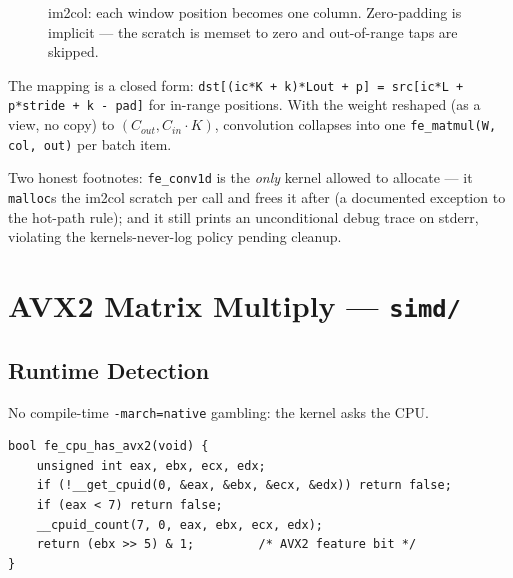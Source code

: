 \documentclass[11pt,a4paper]{article}
\begin{document}
\begin{figure}[h]
\centering
{}
\caption{im2col: each window position becomes one column. Zero-padding is
implicit --- the scratch is memset to zero and out-of-range taps are skipped.}
\label{fig:im2col}
\end{figure}

The mapping is a closed form: \texttt{dst[(ic*K + k)*Lout + p] = src[ic*L +
p*stride + k - pad]} for in-range positions. With the weight reshaped (as a
view, no copy) to $(C_{out}, C_{in}{\cdot}K)$, convolution collapses into one
\texttt{fe\_matmul(W, col, out)} per batch item.

Two honest footnotes: \texttt{fe\_conv1d} is the \emph{only} kernel allowed to
allocate --- it \texttt{malloc}s the im2col scratch per call and frees it after
(a documented exception to the hot-path rule); and it still prints an
unconditional debug trace on stderr, violating the kernels-never-log policy
pending cleanup.

\section{AVX2 Matrix Multiply --- \texttt{simd/}}

\subsection{Runtime Detection}

No compile-time \texttt{-march=native} gambling: the kernel asks the CPU.

\begin{lstlisting}[style=cstyle,caption={simd/matmul\_avx2.c --- CPUID leaf 7, EBX bit 5}]
bool fe_cpu_has_avx2(void) {
    unsigned int eax, ebx, ecx, edx;
    if (!__get_cpuid(0, &eax, &ebx, &ecx, &edx)) return false;
    if (eax < 7) return false;
    __cpuid_count(7, 0, eax, ebx, ecx, edx);
    return (ebx >> 5) & 1;         /* AVX2 feature bit */
}
\end{lstlisting}
\end{document}
